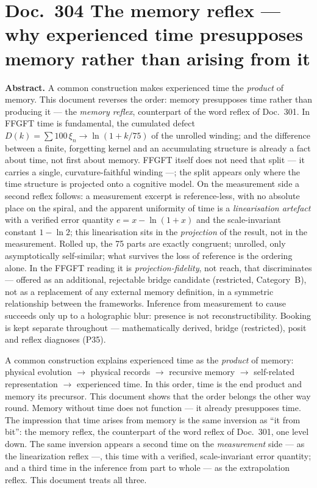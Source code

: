 
\section*{Doc.~304 \quad The memory reflex --- why experienced time presupposes memory
rather than arising from it}

\begingroup\small\noindent
\textbf{Abstract.} A common construction makes experienced time the \emph{product} of memory. This document reverses the order: memory presupposes time rather than producing it --- the \emph{memory reflex}, counterpart of the word reflex of Doc.~301. In FFGFT time is fundamental, the cumulated defect $D(k)=\sum 100\,\xi_n\to\ln(1+k/75)$ of the unrolled winding; and the difference between a finite, forgetting kernel and an accumulating structure is already a fact about time, not first about memory. FFGFT itself does not need that split --- it carries a single, curvature-faithful winding ---; the split appears only where the time structure is projected onto a cognitive model. On the measurement side a second reflex follows: a measurement excerpt is reference-less, with no absolute place on the spiral, and the apparent uniformity of time is a \emph{linearisation artefact} with a verified error quantity $e=x-\ln(1+x)$ and the scale-invariant constant $1-\ln 2$; this linearisation sits in the \emph{projection} of the result, not in the measurement. Rolled up, the 75 parts are exactly congruent; unrolled, only asymptotically self-similar; what survives the loss of reference is the ordering alone. In the FFGFT reading it is \emph{projection-fidelity}, not reach, that discriminates --- offered as an additional, rejectable bridge candidate (restricted, Category~B), not as a replacement of any external memory definition, in a symmetric relationship between the frameworks. Inference from measurement to cause succeeds only up to a holographic blur: presence is not reconstructibility. Booking is kept separate throughout --- mathematically derived, bridge (restricted), posit and reflex diagnoses (P35).
\par\endgroup

\medskip

A common construction explains experienced time as the \emph{product} of memory: physical
evolution $\to$ physical records $\to$ recursive memory $\to$ self-related representation
$\to$ experienced time. In this order, time is the end product and memory its precursor.
This document shows that the order belongs the other way round. Memory without time does
not function --- it already presupposes time. The impression that time arises from memory is
the same inversion as \enquote{it from bit}: the memory reflex, the counterpart of the
word reflex of Doc.~301, one level down. The same inversion appears a second time on the
\emph{measurement} side --- as the linearization reflex ---, this time with a verified,
scale-invariant error quantity; and a third time in the inference from part to whole --- as
the extrapolation reflex. This document treats all three.

